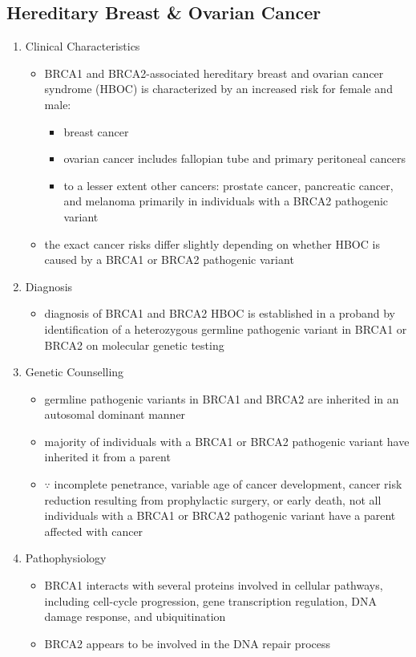 \documentclass[12pt]{scrartcl}
\begin{document}
\subsection{Hereditary Breast \& Ovarian Cancer}
\label{sec:org99d4ab0}
\begin{enumerate}
\item Clinical Characteristics
\label{sec:orgcb182cc}
\begin{itemize}
\item BRCA1 and BRCA2-associated hereditary breast and ovarian cancer
syndrome (HBOC) is characterized by an increased risk for female and
male:
\begin{itemize}
\item breast cancer
\item ovarian cancer includes fallopian tube and primary peritoneal cancers
\item to a lesser extent other cancers: prostate cancer, pancreatic
cancer, and melanoma primarily in individuals with a BRCA2
pathogenic variant
\end{itemize}
\item the exact cancer risks differ slightly depending on whether HBOC is
caused by a BRCA1 or BRCA2 pathogenic variant
\end{itemize}
\item Diagnosis
\label{sec:org2fa8216}
\begin{itemize}
\item diagnosis of BRCA1 and BRCA2 HBOC is established in a proband by
identification of a heterozygous germline pathogenic variant in
BRCA1 or BRCA2 on molecular genetic testing
\end{itemize}

\item Genetic Counselling
\label{sec:orgc70ff4c}
\begin{itemize}
\item germline pathogenic variants in BRCA1 and BRCA2 are inherited in an
autosomal dominant manner
\item majority of individuals with a BRCA1 or BRCA2 pathogenic variant
have inherited it from a parent
\item \(\because\) incomplete penetrance, variable age of cancer development,
cancer risk reduction resulting from prophylactic surgery, or early
death, not all individuals with a BRCA1 or BRCA2 pathogenic variant
have a parent affected with cancer
\end{itemize}

\item Pathophysiology
\label{sec:orgeada76b}
\begin{itemize}
\item BRCA1 interacts with several proteins involved in cellular pathways,
including cell-cycle progression, gene transcription regulation, DNA
damage response, and ubiquitination
\item BRCA2 appears to be involved in the DNA repair process
\end{itemize}
\end{enumerate}
\end{document}
